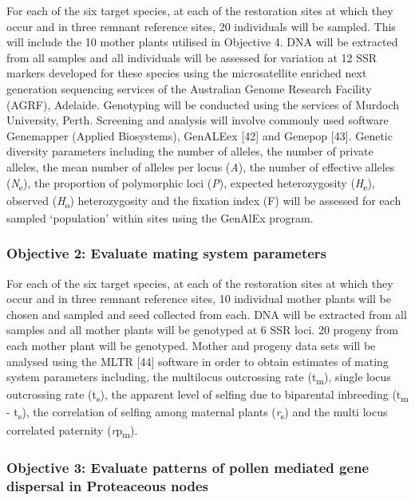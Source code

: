 \documentclass[version=last,
    paper=a4,                               %
    10pt,                                   %
    dvipsnames,
    oneside,                              %
    headings=openany,                       %
    open=any,
    BCOR=7mm,                               %
    DIV=15,     %
]{scrbook}
\begin{document}
For each of the six target species, at each of the restoration sites at
which they occur and in three remnant reference sites, 20 individuals
will be sampled. This will include the 10 mother plants utilised in
Objective 4. DNA will be extracted from all samples and all individuals
will be assessed for variation at 12 SSR markers developed for these
species using the microsatellite enriched next generation sequencing
services of the Australian Genome Research Facility (AGRF), Adelaide.
Genotyping will be conducted using the services of Murdoch University,
Perth. Screening and analysis will involve commonly used software
Genemapper (Applied Biosystems), GenALEex {[}42{]} and Genepop {[}43{]}.
Genetic diversity parameters including the number of alleles, the number
of private alleles, the mean number of alleles per locus (\emph{A}), the
number of effective alleles (\emph{N}\textsubscript{e}), the proportion
of polymorphic loci (\emph{P}), expected heterozygosity
(\emph{H}\textsubscript{e}), observed (\emph{H}\textsubscript{o})
heterozygosity and the fixation index (F) will be assessed for each
sampled `population' within sites using the GenAlEx program.

\hypertarget{objective-2-evaluate-mating-system-parameters}{%
\subsubsection{Objective 2: Evaluate mating system
parameters}\label{objective-2-evaluate-mating-system-parameters}}

For each of the six target species, at each of the restoration sites at
which they occur and in three remnant reference sites, 10 individual
mother plants will be chosen and sampled and seed collected from each.
DNA will be extracted from all samples and all mother plants will be
genotyped at 6 SSR loci. 20 progeny from each mother plant will be
genotyped. Mother and progeny data sets will be analysed using the MLTR
{[}44{]} software in order to obtain estimates of mating system
parameters including, the multilocus outcrossing rate
(t\textsubscript{m}), single locus outcrossing rate
(t\textsubscript{s}), the apparent level of selfing due to biparental
inbreeding (t\textsubscript{m} - t\textsubscript{s}), the correlation of
selfing among maternal plants (\emph{r}\textsubscript{s}) and the multi
locus correlated paternity (\emph{r}p\textsubscript{m}).

\hypertarget{objective-3-evaluate-patterns-of-pollen-mediated-gene-dispersal-in-proteaceous-nodes}{%
\subsubsection{Objective 3: Evaluate patterns of pollen mediated gene
dispersal in Proteaceous
nodes}\label{objective-3-evaluate-patterns-of-pollen-mediated-gene-dispersal-in-proteaceous-nodes}}
\end{document}
